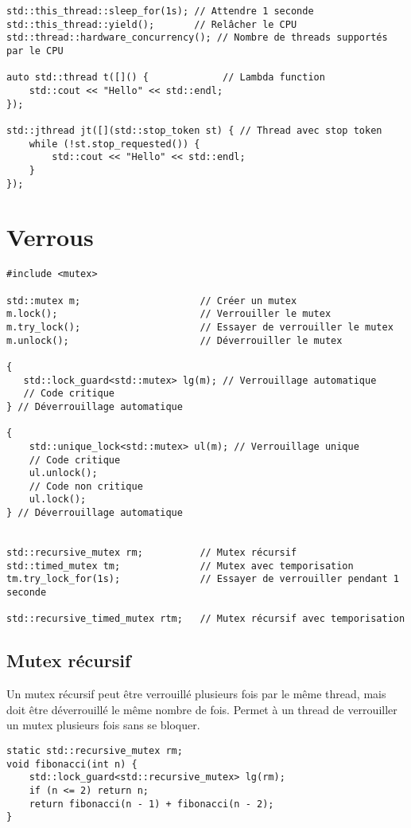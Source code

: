 \documentclass{article}
\begin{document}
\begin{multicols*}{3}
\begin{lstlisting}
std::this_thread::sleep_for(1s); // Attendre 1 seconde
std::this_thread::yield();       // Relâcher le CPU
std::thread::hardware_concurrency(); // Nombre de threads supportés par le CPU

auto std::thread t([]() {             // Lambda function
    std::cout << "Hello" << std::endl;
});

std::jthread jt([](std::stop_token st) { // Thread avec stop token
    while (!st.stop_requested()) {
        std::cout << "Hello" << std::endl;
    }
});
\end{lstlisting}

\section*{Verrous}
\begin{lstlisting}
#include <mutex>

std::mutex m;                     // Créer un mutex
m.lock();                         // Verrouiller le mutex
m.try_lock();                     // Essayer de verrouiller le mutex
m.unlock();                       // Déverrouiller le mutex

{
   std::lock_guard<std::mutex> lg(m); // Verrouillage automatique
   // Code critique
} // Déverrouillage automatique

{
    std::unique_lock<std::mutex> ul(m); // Verrouillage unique
    // Code critique
    ul.unlock();
    // Code non critique
    ul.lock();
} // Déverrouillage automatique


std::recursive_mutex rm;          // Mutex récursif
std::timed_mutex tm;              // Mutex avec temporisation
tm.try_lock_for(1s);              // Essayer de verrouiller pendant 1 seconde

std::recursive_timed_mutex rtm;   // Mutex récursif avec temporisation
\end{lstlisting}

\subsection*{Mutex récursif}
Un mutex récursif peut être verrouillé plusieurs fois par le même thread, mais doit être déverrouillé le même nombre de fois. Permet à un thread de verrouiller un mutex plusieurs fois sans se bloquer.

\begin{lstlisting}
static std::recursive_mutex rm;
void fibonacci(int n) {
    std::lock_guard<std::recursive_mutex> lg(rm);
    if (n <= 2) return n;
    return fibonacci(n - 1) + fibonacci(n - 2);
}
\end{lstlisting}


\end{multicols*}
\end{document}
